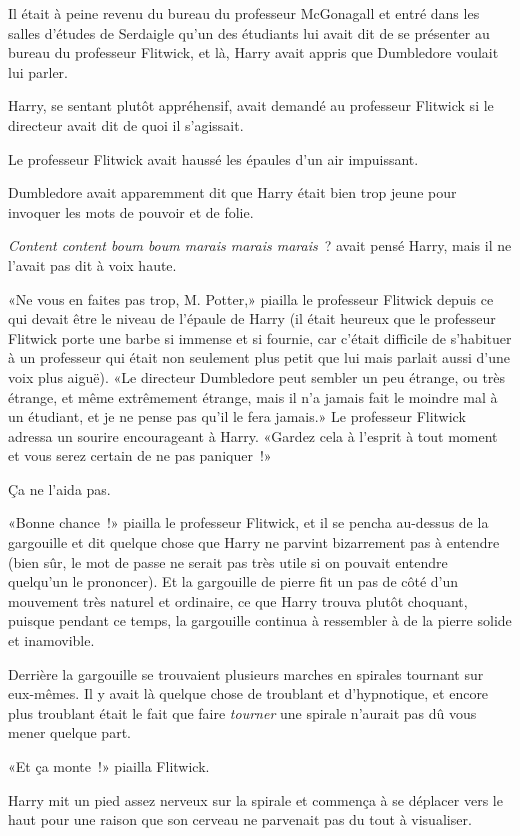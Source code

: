 Il était à peine revenu du bureau du professeur McGonagall et entré dans les salles d'études de Serdaigle qu'un des étudiants lui avait dit de se présenter au bureau du professeur Flitwick, et là, Harry avait appris que Dumbledore voulait lui parler.

Harry, se sentant plutôt appréhensif, avait demandé au professeur Flitwick si le directeur avait dit de quoi il s'agissait.

Le professeur Flitwick avait haussé les épaules d'un air impuissant.

Dumbledore avait apparemment dit que Harry était bien trop jeune pour invoquer les mots de pouvoir et de folie.

\emph{Content content boum boum marais marais marais}~? avait pensé Harry, mais il ne l'avait pas dit à voix haute.

«Ne vous en faites pas trop, M. Potter,» piailla le professeur Flitwick depuis ce qui devait être le niveau de l'épaule de Harry (il était heureux que le professeur Flitwick porte une barbe si immense et si fournie, car c'était difficile de s'habituer à un professeur qui était non seulement plus petit que lui mais parlait aussi d'une voix plus aiguë). «Le directeur Dumbledore peut sembler un peu étrange, ou très étrange, et même extrêmement étrange, mais il n'a jamais fait le moindre mal à un étudiant, et je ne pense pas qu'il le fera jamais.» Le professeur Flitwick adressa un sourire encourageant à Harry. «Gardez cela à l'esprit à tout moment et vous serez certain de ne pas paniquer~!»

Ça ne l'aida pas.

«Bonne chance~!» piailla le professeur Flitwick, et il se pencha au-dessus de la gargouille et dit quelque chose que Harry ne parvint bizarrement pas à entendre (bien sûr, le mot de passe ne serait pas très utile si on pouvait entendre quelqu'un le prononcer). Et la gargouille de pierre fit un pas de côté d'un mouvement très naturel et ordinaire, ce que Harry trouva plutôt choquant, puisque pendant ce temps, la gargouille continua à ressembler à de la pierre solide et inamovible.

Derrière la gargouille se trouvaient plusieurs marches en spirales tournant sur eux-mêmes. Il y avait là quelque chose de troublant et d'hypnotique, et encore plus troublant était le fait que faire \emph{tourner} une spirale n'aurait pas dû vous mener quelque part.

«Et ça monte~!» piailla Flitwick.

Harry mit un pied assez nerveux sur la spirale et commença à se déplacer vers le haut pour une raison que son cerveau ne parvenait pas du tout à visualiser.

